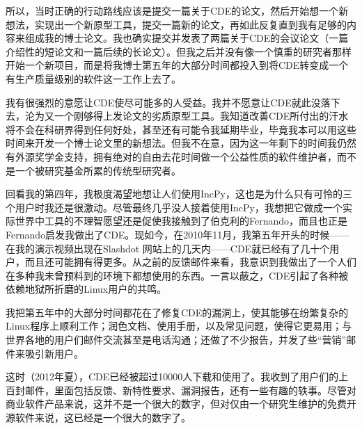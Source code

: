 \documentclass[letter,12pt]{book}
\begin{document}
\begin{CJK}{UTF8}{gbsn}
所以，当时正确的行动路线应该是提交一篇关于CDE的论文，然后开始想一个新想法，实现出一个新原型工具，提交一篇新的论文，再如此反复直到我有足够的内容来组成我的博士论文。我也确实提交并发表了两篇关于CDE的会议论文（一篇介绍性的短论文和一篇后续的长论文）。但我之后并没有像一个慎重的研究者那样开始一个新项目，而是将我博士第五年的大部分时间都投入到将CDE转变成一个有生产质量级别的软件这一工作上去了。

我有很强烈的意愿让CDE使尽可能多的人受益。我并不愿意让CDE就此没落下去，沦为又一个刚够得上发论文的劣质原型工具。我知道改善CDE所付出的汗水将不会在科研界得到任何好处，甚至还有可能令我延期毕业，毕竟我本可以用这些时间来开发一个博士论文里的新想法。但我不在意，因为这一年剩下的时间我仍然有外源奖学金支持，拥有绝对的自由去花时间做一个公益性质的软件维护者，而不是一个被研究基金所累的传统型研究者。

回看我的第四年，我极度渴望地想让人们使用IncPy，这也是为什么只有可怜的三个用户时我还是很激动。尽管最终几乎没人接着使用IncPy，我想把它做成一个实际世界中工具的不理智愿望还是促使我接触到了伯克利的Fernando，而且也正是Fernando启发我做出了CDE。现如今，在2010年11月，我第五年开头的时候——在我的演示视频出现在Slashdot 网站上的几天内——CDE就已经有了几十个用户，而且还可能拥有得更多。从之前的反馈邮件来看，我意识到我做出了一个人们在多种我未曾预料到的环境下都想使用的东西。一言以蔽之，CDE引起了各种被依赖地狱所折磨的Linux用户的共鸣。

\breakline

我把第五年中的大部分时间都花在了修复CDE的漏洞上，使其能够在纷繁复杂的Linux程序上顺利工作；润色文档、使用手册，以及常见问题，使得它更易用；与世界各地的用户们邮件交流甚至是电话沟通；还做了不少报告，并发了些“营销”邮件来吸引新用户。

这时（2012年夏），CDE已经被超过10000人下载和使用了。我收到了用户们的上百封邮件，里面包括反馈、新特性要求、漏洞报告，还有一些有趣的轶事。尽管对商业软件产品来说，这并不是一个很大的数字，但对仅由一个研究生维护的免费开源软件来说，这已经是一个很大的数字了。


\end{CJK}
\end{document}
